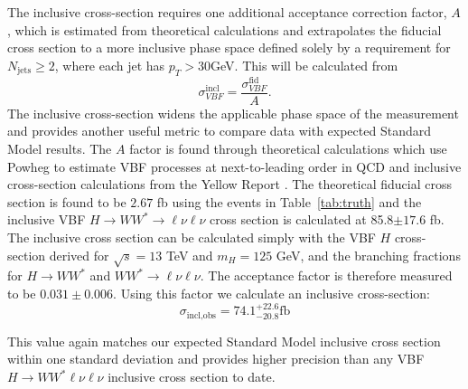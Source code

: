 The inclusive cross-section requires one additional acceptance correction factor, $A$, which is estimated from theoretical calculations and extrapolates the fiducial cross section to a more inclusive phase space defined solely by a requirement for $N_{\text{jets}}\geq2$, where each jet has $p_T>30$GeV. This will be calculated from
\begin{equation}
\sigma_{VBF}^{\text{incl}} = \frac{\sigma_{VBF}^{\text{fid}}}{A}.
\end{equation}
The inclusive cross-section widens the applicable phase space of the measurement and provides another useful metric to compare data with expected Standard Model results. The $A$ factor is found through theoretical calculations which use Powheg to estimate VBF processes at next-to-leading order in QCD and inclusive cross-section calculations from the Yellow Report \cite{LHCCrossSectionWG}. The theoretical fiducial cross section is found to be $2.67$ fb using the events in Table~\ref{tab:truth} and the inclusive VBF $H\rightarrow WW^*\rightarrow \ell\nu\ell\nu$ cross section is calculated at 85.8$\pm 17.6$ fb. The inclusive cross section can be calculated simply with the VBF $H$ cross-section derived for $\sqrt{s}=13$ TeV and $m_H=125$ GeV, and the branching fractions for $H\rightarrow WW^*$ and $WW^*\rightarrow\ell\nu\ell\nu$.  The acceptance factor is therefore measured to be $0.031 \pm 0.006$. Using this factor we calculate an inclusive cross-section:
\begin{equation}
\sigma_{\text{incl,obs}} = 74.1^{+22.6}_{-20.8} \text{fb}
\end{equation} 

This value again matches our expected Standard Model inclusive cross section within one standard deviation and provides higher precision than any VBF $H\rightarrow WW^*\ell\nu\ell\nu$ inclusive cross section to date. 

